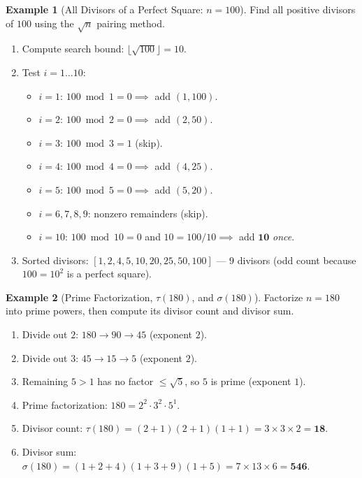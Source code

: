 \documentclass[11pt,a4paper]{article}
\theoremstyle{definition}
\newtheorem{example}{Example}[section]
\begin{document}
\begin{example}[All Divisors of a Perfect Square: $n = 100$]
Find all positive divisors of $100$ using the $\sqrt{n}$ pairing method.
\begin{enumerate}
    \item Compute search bound: $\lfloor \sqrt{100} \rfloor = 10$.
    \item Test $i = 1 \dots 10$:
    \begin{itemize}
        \item $i = 1$: $100 \bmod 1 = 0 \implies$ add $(1, 100)$.
        \item $i = 2$: $100 \bmod 2 = 0 \implies$ add $(2, 50)$.
        \item $i = 3$: $100 \bmod 3 = 1$ (skip).
        \item $i = 4$: $100 \bmod 4 = 0 \implies$ add $(4, 25)$.
        \item $i = 5$: $100 \bmod 5 = 0 \implies$ add $(5, 20)$.
        \item $i = 6, 7, 8, 9$: nonzero remainders (skip).
        \item $i = 10$: $100 \bmod 10 = 0$ and $10 = 100 / 10 \implies$ add $\mathbf{10}$ \emph{once}.
    \end{itemize}
    \item Sorted divisors: $[1, 2, 4, 5, 10, 20, 25, 50, 100]$ --- $9$ divisors (odd count because $100 = 10^2$ is a perfect square).
\end{enumerate}
\end{example}

\begin{example}[Prime Factorization, $\tau(180)$, and $\sigma(180)$]
Factorize $n = 180$ into prime powers, then compute its divisor count and divisor sum.
\begin{enumerate}
    \item Divide out $2$: $180 \to 90 \to 45$ (exponent $2$).
    \item Divide out $3$: $45 \to 15 \to 5$ (exponent $2$).
    \item Remaining $5 > 1$ has no factor $\le \sqrt{5}$, so $5$ is prime (exponent $1$).
    \item Prime factorization: $180 = 2^2 \cdot 3^2 \cdot 5^1$.
    \item Divisor count: $\tau(180) = (2 + 1)(2 + 1)(1 + 1) = 3 \times 3 \times 2 = \mathbf{18}$.
    \item Divisor sum: $\sigma(180) = (1 + 2 + 4)(1 + 3 + 9)(1 + 5) = 7 \times 13 \times 6 = \mathbf{546}$.
\end{enumerate}
\end{example}
\end{document}
